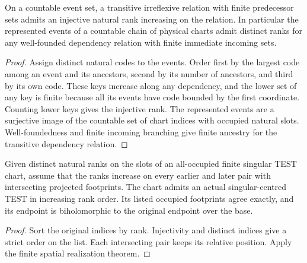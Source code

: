\begin{theorem}
\label{hir:g8-injective-ancestry-rank}
\leanok
On a countable event set, a transitive irreflexive relation with
finite predecessor sets admits an injective natural rank increasing
on the relation. In particular the represented events of a countable
chain of physical charts admit distinct ranks for any well-founded
dependency relation with finite immediate incoming sets.
\end{theorem}
\begin{proof}
Assign distinct natural codes to the events. Order first by the
largest code among an event and its ancestors, second by its number
of ancestors, and third by its own code. These keys increase along
any dependency, and the lower set of any key is finite because all
its events have code bounded by the first coordinate. Counting
lower keys gives the injective rank. The represented events are a
surjective image of the countable set of chart indices with occupied
natural slots. Well-foundedness and finite incoming branching give
finite ancestry for the transitive dependency relation.
\end{proof}

\begin{theorem}
\label{hir:g8-rank-sorted-spatial-chart}
\leanok
Given distinct natural ranks on the slots of an all-occupied finite
singular TEST chart, assume that the ranks increase on every earlier
and later pair with intersecting projected footprints. The chart
admits an actual singular-centred TEST in increasing rank order. Its
listed occupied footprints agree exactly, and its endpoint is
biholomorphic to the original endpoint over the base.
\end{theorem}
\begin{proof}
Sort the original indices by rank. Injectivity and distinct indices
give a strict order on the list. Each intersecting pair keeps its
relative position. Apply the finite spatial realization theorem.
\end{proof}

